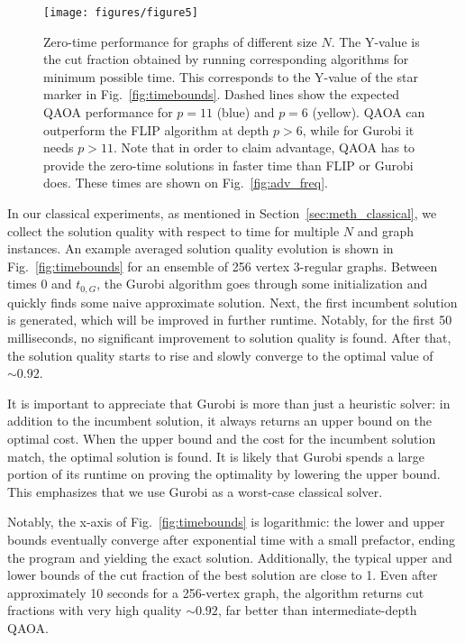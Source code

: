 \documentclass[prb,reprint,nofootinbib,longbibliography,superscriptaddress]{revtex4-1}
\newcommand*{\red}{\textcolor{red}}
\newcommand{\jw}[1]{{\textbf{\red{#1}}}}
\begin{document}
\begin{figure}
    \texttt{[image: figures/figure5]}
    \caption{
    Zero-time performance for graphs of different size $N$.
    The Y-value is the cut fraction obtained by running corresponding algorithms for minimum possible time. This corresponds to the Y-value of the star marker in Fig.~\ref{fig:timebounds}.
    Dashed lines show the expected QAOA performance for $p=11$ (blue) and $p=6$ (yellow). QAOA can outperform the FLIP algorithm at depth $p>6$, while for Gurobi it needs $p>11$.
    Note that in order to claim advantage, QAOA has to provide the zero-time solutions in faster time than FLIP or Gurobi does. These times are shown on Fig.~\ref{fig:adv_freq}.
    }
    \label{fig:t0_cutf}
\end{figure}


In our classical experiments, as mentioned in Section~\ref{sec:meth_classical},
we collect the solution quality with respect to time for multiple $N$ and graph instances.
An example averaged solution quality evolution is shown in Fig.~\ref{fig:timebounds} for an ensemble of 256 vertex 3-regular graphs. Between times 0 and $t_{0, G}$, the Gurobi algorithm goes through some initialization and quickly finds some naive approximate solution. Next, the first incumbent solution is generated, which will be improved in further runtime. Notably, for the first 50 milliseconds, no significant improvement to solution quality is found. After that, the solution quality starts to rise and slowly converge to the optimal value of $\sim 0.92$.



It is important to appreciate that Gurobi is more than just a heuristic solver: in addition to the incumbent solution, it always returns an upper bound on the optimal cost. 
When the upper bound and the cost for the incumbent solution match, the optimal solution is found.
It is likely that Gurobi spends a large portion of its runtime on proving the optimality by lowering the upper bound. This emphasizes that we use Gurobi as a worst-case classical solver.


Notably, the x-axis of Fig.~\ref{fig:timebounds} is logarithmic: the lower and upper bounds eventually converge after exponential time with a small prefactor, ending the program and yielding the exact solution. Additionally, the typical upper and lower bounds of the cut fraction of the best solution are close to 1. Even after approximately 10 seconds for a 256-vertex graph, the algorithm returns cut fractions with very high quality $\sim 0.92$, far better than intermediate-depth QAOA.
\end{document}
